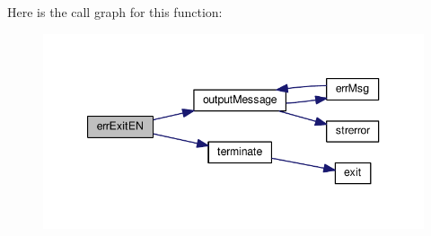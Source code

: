 Here is the call graph for this function\-:
\nopagebreak
\begin{figure}[H]
\begin{center}
\leavevmode
\includegraphics[width=344pt]{d2/d3d/common_2README_a6d6d5790ca5bffa970baeeefd8a28462_cgraph}
\end{center}
\end{figure}


